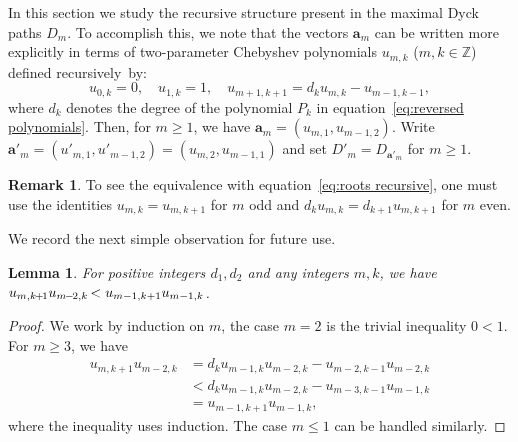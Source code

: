 \documentclass[10pt]{amsart}
\newtheorem{lemma}[theorem]{Lemma}
\theoremstyle{definition}
\newtheorem{remark}[theorem]{Remark}
\newcommand{\bfa}{\mathbf{a}}
\newcommand{\ZZ}{\mathbb{Z}}
\newcommand*{\Mk}{\mkern -2mu}
\begin{document}
In this section we study the recursive structure present in the maximal Dyck paths $D_m$. 
To accomplish this, we note that the vectors $\bfa_m$ can be written more explicitly in terms of two-parameter Chebyshev polynomials $u_{m,k}$ ($m,k\in \ZZ$) defined recursively~by: 
\begin{equation}
 \label{eq:chebyshev}
 u_{0,k}=0,\quad
 u_{1,k}=1,\quad
 u_{m+1,k+1}=d_ku_{m,k}-u_{m-1,k-1},
\end{equation}
where $d_k$ denotes the degree of the polynomial $P_k$ in equation~\eqref{eq:reversed polynomials}. 
Then, for $m\ge 1$, we have $\bfa_m=(u_{m,1},u_{m-1,2})$. Write $\bfa'_m=(u'_{m,1},u'_{m-1,2})=(u_{m,2},u_{m-1,1})$ and set $D'_m=D_{\bfa'_m}$ for $m\ge1$. 
\begin{remark}
 \label{rem:chebyshev}
 To see the equivalence with equation~\eqref{eq:roots recursive}, one must use the identities $u_{m,k}=u_{m,k+1}$ for $m$ odd and $d_ku_{m,k}=d_{k+1}u_{m,k+1}$ for $m$ even.
\end{remark}
We record the next simple observation for future use.
\begin{lemma}
 \label{le:Dyck path inequality}
 For positive integers $d_1,d_2$ and any integers $m,k$, we have $u_{m,k\Mk +\Mk 1}u_{m\Mk -\Mk 2,k}\Mk <u_{m-1,k+1}u_{m-1,k}$.
\end{lemma}
\begin{proof}
 We work by induction on $m$, the case $m=2$ is the trivial inequality $0<1$. 
 For $m\ge3$, we have
 \begin{align*}
 u_{m,k+1}u_{m-2,k}
 &=d_ku_{m-1,k}u_{m-2,k}-u_{m-2,k-1}u_{m-2,k}\\
 &<d_ku_{m-1,k}u_{m-2,k}-u_{m-3,k-1}u_{m-1,k}\\
 &=u_{m-1,k+1}u_{m-1,k},
 \end{align*}
 where the inequality uses induction.
 The case $m\le 1$ can be handled similarly.
\end{proof}
\end{document}
